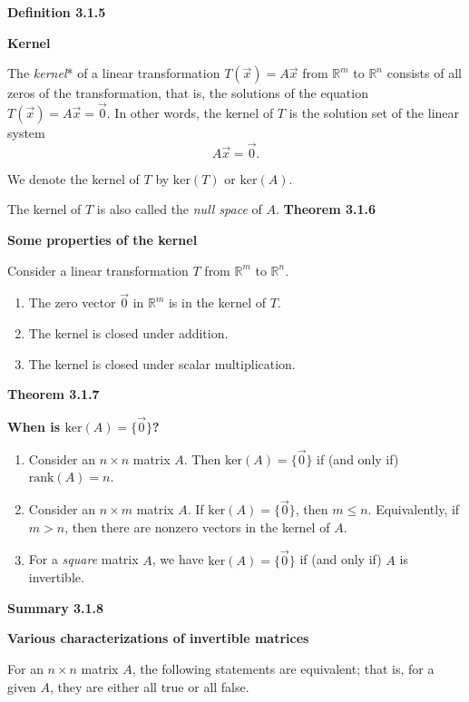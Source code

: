 \textbf{Definition 3.1.5}\\
\par\noindent\textbf{Kernel}
\par\noindent The \textit{kernel}* of a linear transformation $T(\vec{x})=A\vec{x}$ from $\mathbb{R}^{m}$ to $\mathbb{R}^{n}$ consists of all zeros of the transformation, that is, the solutions of the equation $T(\vec{x})=A\vec{x}=\vec{0}$. In other words, the kernel of $T$ is the solution set of the linear system
\[A\vec{x}=\vec{0}.\]
\par\noindent We denote the kernel of $T$ by $\textrm{ker}(T)$ or $\textrm{ker}(A)$.
\par\noindent *The kernel of $T$ is also called the \textit{null space} of $A$.
\textbf{Theorem 3.1.6}\\
\par\noindent\textbf{Some properties of the kernel}
\par\noindent Consider a linear transformation $T$ from $\mathbb{R}^{m}$ to $\mathbb{R}^{n}$.
\renewcommand{\labelenumi}{\textbf{\alph{enumi}.}}
\begin{enumerate}
\item The zero vector $\vec{0}$ in $\mathbb{R}^{m}$ is in the kernel of $T$.
\item The kernel is closed under addition.
\item The kernel is closed under scalar multiplication.
\end{enumerate}
\textbf{Theorem 3.1.7}\\
\par\noindent\textbf{When is $\textrm{ker}(A)=\{\vec{0}\}$?}
\renewcommand{\labelenumi}{\textbf{\alph{enumi}.}}
\begin{enumerate}
\item Consider an $n\times{}n$ matrix $A$. Then $\textrm{ker}(A)=\{\vec{0}\}$ if (and only if) $\textrm{rank}(A)=n$.
\item Consider an $n\times{}m$ matrix $A$. If $\textrm{ker}(A)=\{\vec{0}\}$, then $m\le{}n$. Equivalently, if $m>n$, then there are nonzero vectors in the kernel of $A$.
\item For a \textit{square} matrix $A$, we have $\textrm{ker}(A)=\{\vec{0}\}$ if (and only if) $A$ is invertible.
\end{enumerate}
\textbf{Summary 3.1.8}\\
\par\noindent\textbf{Various characterizations of invertible matrices}
\par\noindent For an $n\times{}n$ matrix $A$, the following statements are equivalent; that is, for a given $A$, they are either all true or all false.
